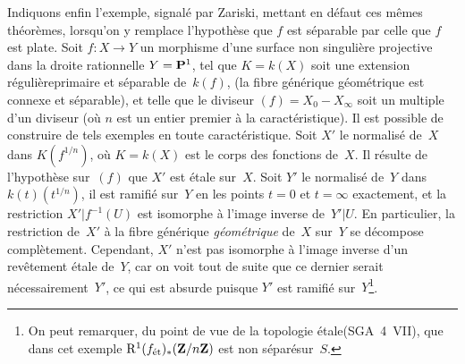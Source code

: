 Indiquons enfin l'exemple, signal\'e par Zariski, mettant en
d\'efaut ces m\^emes th\'eor\`emes, lorsqu'on y remplace
l'hypoth\`ese que $f$ est s\'eparable par celle que $f$ est
plate. Soit $f\colon X\to Y$ un morphisme d'une surface non
singuli\`ere projective dans la droite rationnelle $Y=\mathbf{P}^1$, tel
que
$K=k(X)$
soit une extension \og r\'eguli\`ere\fg \ie primaire et
s\'eparable de~$k(f)$, (\ie la fibre g\'en\'erique
g\'eom\'etrique est connexe et s\'eparable), et telle que le
diviseur $(f)=X_0-X_\infty$ soit un multiple
\nieme
d'un diviseur (o\`u $n$ est un entier premier \`a la
caract\'eristique). Il est possible de construire de tels exemples
en toute caract\'eristique. Soit $X'$ le normalis\'e de~$X$ dans
$K(f^{1/n})$, o\`u $K=k(X)$ est le corps des fonctions de~$X$. Il
r\'esulte de l'hypoth\`ese sur~$(f)$ que $X'$ est \'etale
sur~$X$. Soit $Y'$ le normalis\'e de~$Y$ dans $k(t)(t^{1/n})$, il
est ramifi\'e sur~$Y$ en les points $t=0$ et $t=\infty$ exactement,
et la restriction $X'|f^{-1}(U)$ est isomorphe \`a l'image inverse
de~$Y'|U$. En particulier, la restriction de~$X'$ \`a la fibre
g\'en\'erique \emph{géométrique} de~$X$ sur~$Y$ se
d\'ecompose compl\`etement. Cependant, $X'$ n'est pas isomorphe
\`a l'image inverse d'un rev\^etement \'etale de~$Y$, car on
voit tout de suite que ce dernier serait n\'ecessairement~$Y'$, ce
qui est absurde puisque $Y'$ est ramifi\'e sur~$Y$\footnote{On peut
remarquer, du point de vue de la \og topologie \'etale\fg (SGA~4~VII),
que dans cet exemple $\mathrm{R}^1(f_{\mathrm{\acute{e}t}})_*(\mathbf{Z}/n\mathbf{Z})$ est \og non
s\'epar\'e\fg sur~$S$.}.


